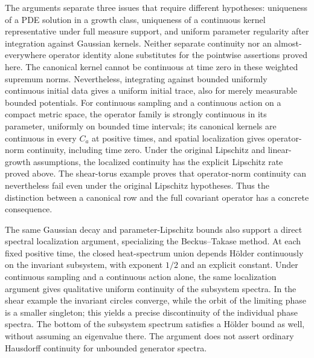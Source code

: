 The arguments separate three issues that require different hypotheses:
uniqueness of a PDE solution in a growth class, uniqueness of a continuous
kernel representative under full measure support, and uniform parameter
regularity after integration against Gaussian kernels. Neither separate
continuity nor an almost-everywhere operator identity alone substitutes
for the pointwise assertions proved here. The canonical kernel cannot be continuous at time zero in these weighted
supremum norms. Nevertheless, integrating against bounded uniformly
continuous initial data gives a uniform initial trace, also for merely
measurable bounded potentials. For continuous sampling and a continuous action on a
compact metric space, the operator family is strongly continuous in its
parameter, uniformly on bounded time intervals; its canonical kernels
are continuous in every $C_a$ at positive times, and spatial localization
gives operator-norm continuity, including time zero. Under the original
Lipschitz and linear-growth assumptions, the localized continuity has
the explicit Lipschitz rate proved above. The shear-torus example
proves that operator-norm continuity can nevertheless fail even under
the original Lipschitz hypotheses. Thus the distinction between a
canonical row and the full covariant operator has a concrete consequence.

The same Gaussian decay and parameter-Lipschitz bounds also support a
direct spectral localization argument, specializing the Beckus--Takase
method. At each fixed positive time, the closed heat-spectrum union
depends H\"older continuously on the invariant subsystem, with exponent
$1/2$ and an explicit constant. Under continuous sampling and a continuous
action alone, the same localization argument gives qualitative uniform
continuity of the subsystem spectra. In the shear example the invariant
circles converge, while the orbit of the limiting phase is a smaller
singleton; this yields a precise discontinuity of the individual phase
spectra. The bottom of the subsystem spectrum satisfies a H\"older bound
as well, without assuming an eigenvalue there. The argument does not
assert ordinary Hausdorff continuity for unbounded generator spectra.

\printbibliography[heading=bibintoc,title={References}]


